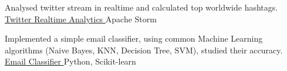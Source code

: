 \begin{cventries}
  \cventry
    {Analysed twitter stream in realtime and calculated top worldwide
hashtags.} %
    {\href{https://github.com/rajdeepbharati/Twitter-Realtime-Analytics}{Twitter Realtime Analytics \ExternalLink}} %
    {Apache Storm} %
    {} %
    {}
    \vspace{-\baselineskip}

  \cventry
    {Implemented a simple email classifier, using common Machine Learning algorithms (Naive Bayes, KNN, Decision Tree, SVM), studied their accuracy.} %
    {\href{https://github.com/rajdeepbharati/Email-Classifier}{Email Classifier \ExternalLink}} %
    {Python, Scikit-learn} %
    {} %
    {}
    \vspace{-\baselineskip}
\begin{comment}

  \cventry
    {A collection of python scripts to automate Facebook.} %
    {\href{https://github.com/rajdeepbharati/FB-Automation}{FB Automation \ExternalLink}} %
    {Python, Selenium} %
    {} %
    {}
    \vspace{-\baselineskip}

  \cventry
    {A collection of python scripts to automate Facebook.} %
    {\href{https://github.com/rajdeepbharati/FB-Automation}{FB Automation \ExternalLink}} %
    {Python, Selenium} %
    {} %
    {
      \begin{cvitems} %
      \end{cvitems}
    }
    \vspace{-\baselineskip}

\end{comment}


\end{cventries}
